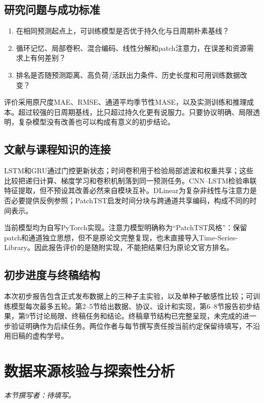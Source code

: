 \documentclass[10pt,a4paper]{article}
\begin{document}
\subsection{研究问题与成功标准}
\begin{enumerate}
\item 在相同预测起点上，可训练模型是否优于持久化与日周期朴素基线？
\item 循环记忆、局部卷积、混合编码、线性分解和patch注意力，在误差和资源需求上有何差别？
\item 排名是否随预测距离、高负荷/活跃出力条件、历史长度和可用训练数据改变？
\end{enumerate}
评价采用原尺度MAE、RMSE、通道平均季节性MASE，以及实测训练和推理成本。超过较强的日周期基线，比只超过持久化更有说服力。只要协议明确、局限透明，复杂模型没有改善也可以构成有意义的初步结论。
\subsection{文献与课程知识的连接}
LSTM\cite{lstm}和GRU\cite{gru}通过门控更新状态；时间卷积用于检验局部滤波和权重共享；这些比较把递归计算、梯度学习和卷积机制落到同一预测任务。CNN–LSTM检验串联特征提取，但不预设其改善必然来自模块互补。DLinear\cite{dlinear}为复杂非线性与注意力是否必要提供反例参照；PatchTST\cite{patch}启发时间分块与跨通道共享编码，构成不同的时间表示。

当前模型均为自写PyTorch实现。注意力模型明确称为“PatchTST风格”：保留patch和通道独立思想，但不是原论文完整复现，也未直接导入Time-Series-Library。因此报告评价的是随附实现，不能把结果归为原论文官方排名。
\subsection{初步进度与终稿结构}
本次初步报告包含正式发布数据上的三种子主实验，以及单种子敏感性比较；可训练模型每次最多五轮。第2–5节给出数据、协议、设计和实现，第6–8节报告初步结果，第9节讨论局限、终稿任务和结论。终稿章节结构已完整呈现，未完成的进一步验证明确作为后续任务\cite{course}。两位作者与每节撰写责任按当前约定保留待填写，不沿用旧稿的虚构学号。

\clearpage
\section{数据来源核验与探索性分析}
\noindent\textit{本节撰写者：待填写。}
\end{document}
